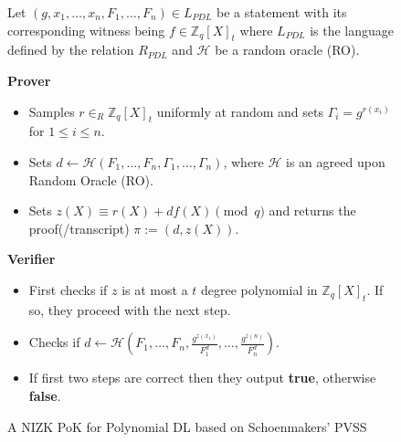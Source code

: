 \begin{figure}[ht]
    \centering
    \begin{tcolorbox}[title=$\pi_{PDL}$, width=0.9\textwidth, colframe=blue!75!black, colback=blue!10, sharp corners]
        Let $(g,x_1,\dots,x_n,F_1,\dots,F_n)\in L_{PDL}$ be a statement with its corresponding witness being $f\in\mathbb{Z}_q[X]_t$ 
        where $L_{PDL}$ is the language defined by the relation $R_{PDL}$ and $\mathcal{H}$ be a random oracle (RO). 
        
        \vspace{0.5em}
        \textbf{Prover}
        \begin{itemize}
            \item Samples $r\in_{R}\mathbb{Z}_q[X]_t$ uniformly at random and sets 
                $\Gamma_i=g^{r(x_i)}$ for $1\leq i\leq n$.
            \item Sets $d\leftarrow \mathcal{H}(F_1, \dots, F_n, \Gamma_1, \dots, \Gamma_n)$, where $\mathcal{H}$ is 
                an agreed upon Random Oracle (RO).
            \item Sets $z(X)\equiv r(X)+df(X) \pmod{q}$ and returns the proof(/transcript) $\pi:= (d,z(X))$.
        \end{itemize}
        
        \vspace{0.5em}
        \textbf{Verifier}
        \begin{itemize}
            \item First checks if $z$ is at most a $t$ degree polynomial in $\mathbb{Z}_q[X]_t$. If so, they proceed with the next step.
            \item Checks if $d\leftarrow \mathcal{H}(F_1, \dots, F_n,\frac{g^{z(x_1)}}{F_1^d}, \dots, \frac{g^{z(n)}}{F_n^d})$. 
            \item If first two steps are correct then they output \textbf{true}, otherwise \textbf{false}.
        \end{itemize}
    \end{tcolorbox}
    \caption{A NIZK PoK for Polynomial DL based on Schoenmakers' PVSS}
    \label{fig:polynomial-dl}
\end{figure}
